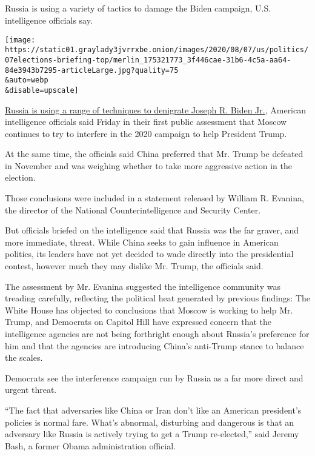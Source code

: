 \subsection{}

Russia is using a variety of tactics to damage the Biden campaign, U.S.
intelligence officials say.

\texttt{[image: https://static01.graylady3jvrrxbe.onion/images/2020/08/07/us/politics/07elections-briefing-top/merlin\_175321773\_3f446cae-31b6-4c5a-aa64-84e3943b7295-articleLarge.jpg?quality=75\\\&auto=webp\\\&disable=upscale]}

\href{https://www.nytimes3xbfgragh.onion/2020/08/07/us/politics/russia-china-trump-biden-election-interference.html}{Russia
is using a range of techniques to denigrate Joseph R. Biden Jr.},
American intelligence officials said Friday in their first public
assessment that Moscow continues to try to interfere in the 2020
campaign to help President Trump.

At the same time, the officials said China preferred that Mr. Trump be
defeated in November and was weighing whether to take more aggressive
action in the election.

Those conclusions were included in a statement released by William R.
Evanina, the director of the National Counterintelligence and Security
Center.

But officials briefed on the intelligence said that Russia was the far
graver, and more immediate, threat. While China seeks to gain influence
in American politics, its leaders have not yet decided to wade directly
into the presidential contest, however much they may dislike Mr. Trump,
the officials said.

The assessment by Mr. Evanina suggested the intelligence community was
treading carefully, reflecting the political heat generated by previous
findings: The White House has objected to conclusions that Moscow is
working to help Mr. Trump, and Democrats on Capitol Hill have expressed
concern that the intelligence agencies are not being forthright enough
about Russia's preference for him and that the agencies are introducing
China's anti-Trump stance to balance the scales.

Democrats see the interference campaign run by Russia as a far more
direct and urgent threat.

``The fact that adversaries like China or Iran don't like an American
president's policies is normal fare. What's abnormal, disturbing and
dangerous is that an adversary like Russia is actively trying to get a
Trump re-elected,'' said Jeremy Bash, a former Obama administration
official.


